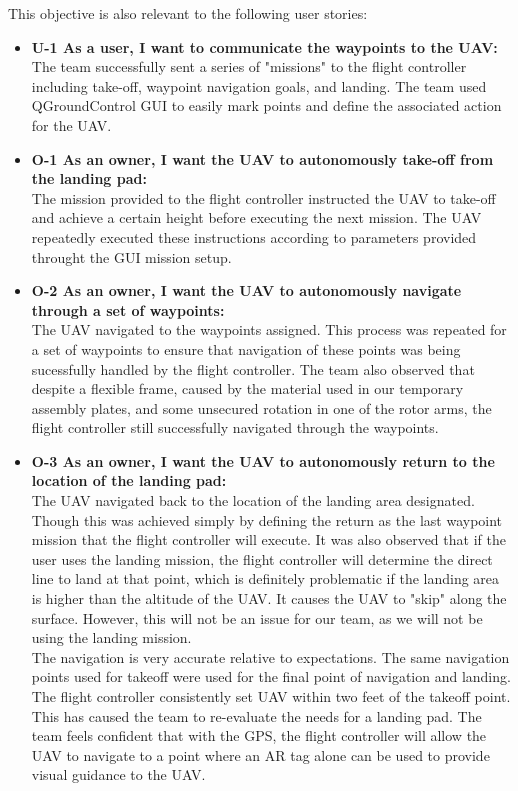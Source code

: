 \begin{itemize}
This objective is also relevant to the following user stories:
\begin{itemize}
\item \textbf{U-1 As a user, I want to communicate the waypoints to the UAV:} \\
The team successfully sent a series of "missions" to the flight controller including take-off, waypoint navigation goals, and landing. The team used QGroundControl GUI to easily mark points and define the associated action for the UAV.
\item \textbf{O-1 As an owner, I want the UAV to autonomously take-off from the landing pad:} \\
The mission provided to the flight controller instructed the UAV to take-off and achieve a certain height before executing the next mission. The UAV repeatedly executed these instructions according to parameters provided throught the GUI mission setup.
\item \textbf{O-2 As an owner, I want the UAV to autonomously navigate through a set of waypoints:} \\
The UAV navigated to the waypoints assigned. This process was repeated for a set of waypoints to ensure that navigation of these points was being sucessfully handled by the flight controller. The team also observed that despite a flexible frame, caused by the material used in our temporary assembly plates, and some unsecured rotation in one of the rotor arms, the flight controller still successfully navigated through the waypoints.
\item \textbf{O-3 As an owner, I want the UAV to autonomously return to the location of the landing pad:} \\
The UAV navigated back to the location of the landing area designated. Though this was achieved simply by defining the return as the last waypoint mission that the flight controller will execute. It was also observed that if the user uses the landing mission, the flight controller will determine the direct line to land at that point, which is definitely problematic if the landing area is higher than the altitude of the UAV. It causes the UAV to "skip" along the surface. However, this will not be an issue for our team, as we will not be using the landing mission. \\
The navigation is very accurate relative to expectations. The same navigation points used for takeoff were used for the final point of navigation and landing. The flight controller consistently set UAV within two feet of the takeoff point. This has caused the team to re-evaluate the needs for a landing pad. The team feels confident that with the GPS, the flight controller will allow the UAV to navigate to a point where an AR tag alone can be used to provide visual guidance to the UAV.
\end{itemize} 
\end{itemize}


